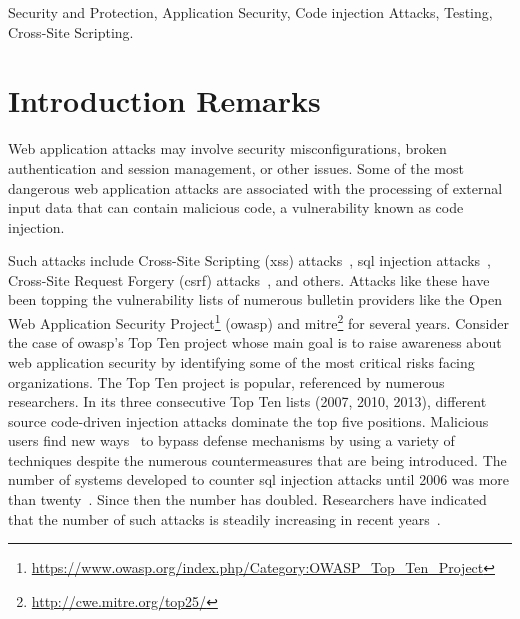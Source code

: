 \documentclass[conference]{IEEEtran}
\begin{document}
\begin{IEEEkeywords}
Security and Protection, Application Security, Code injection Attacks,
Testing, Cross-Site Scripting.
\end{IEEEkeywords}

\IEEEpeerreviewmaketitle

\section{Introduction Remarks}

Web application attacks may involve security misconfigurations, broken
authentication and session management, or other issues. Some of the
most dangerous web application attacks are associated with the
processing of external input data that can contain malicious code, a
vulnerability known as code injection.

Such attacks include Cross-Site Scripting ({\sc xss})
attacks~\cite{SG07}, {\sc sql} injection attacks~\cite{RL12b},
Cross-Site Request Forgery ({\sc csrf}) attacks~\cite{LZRL09}, and
others. Attacks like these have been topping the vulnerability lists
of numerous bulletin providers like the Open Web Application Security
Project\footnote{\url{https://www.owasp.org/index.php/Category:OWASP_Top_Ten_Project}}
({\sc owasp}) and {\sc
  mitre}\footnote{\url{http://cwe.mitre.org/top25/}} for several
years. Consider the case of {\sc owasp}'s Top Ten project whose main
goal is to raise awareness about web application security by
identifying some of the most critical risks facing organizations. The
Top Ten project is popular, referenced by numerous researchers. In its
three consecutive Top Ten lists (2007, 2010, 2013), different source
code-driven injection attacks dominate the top five positions.
Malicious users find new ways~\cite{HNSHS12,DKH14} to bypass defense
mechanisms by using a variety of techniques despite the numerous
countermeasures that are being introduced. The number of systems
developed to counter {\sc sql} injection attacks until 2006 was more
than twenty~\cite{HVO06}. Since then the number has doubled.
Researchers have indicated that the number of such attacks is steadily
increasing in recent years~\cite{SSL12}.
\end{document}
